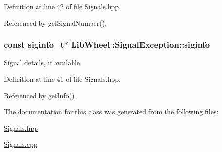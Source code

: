 \-Definition at line 42 of file \-Signals.\-hpp.



\-Referenced by get\-Signal\-Number().

\hypertarget{classLibWheel_1_1SignalException_a687eb8c7e9e577738968313c1be0cd5b}{
\subsubsection[{siginfo}]{\setlength{\rightskip}{0pt plus 5cm}const siginfo\-\_\-t$\ast$ {\bf \-Lib\-Wheel\-::\-Signal\-Exception\-::siginfo}}}
\label{classLibWheel_1_1SignalException_a687eb8c7e9e577738968313c1be0cd5b}


\-Signal details, if available. 



\-Definition at line 41 of file \-Signals.\-hpp.



\-Referenced by get\-Info().



\-The documentation for this class was generated from the following files\-:\begin{DoxyCompactItemize}
\item 
\hyperlink{Signals_8hpp}{\-Signals.\-hpp}\item 
\hyperlink{Signals_8cpp}{\-Signals.\-cpp}\end{DoxyCompactItemize}
